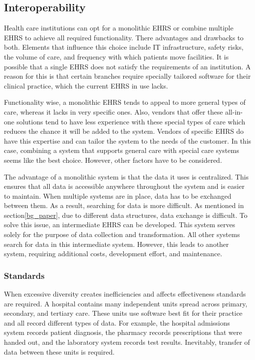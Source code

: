     


    \subsection{Interoperability}\label{bg_interoperability}

    Health care institutions can opt for a monolithic EHRS or combine multiple EHRS to achieve all required functionality. There advantages and drawbacks to both\cite{multiple_ehrs}. Elements that influence this choice include IT infrastructure, safety risks, the volume of care, and frequency with which patients move facilities. It is possible that a single EHRS does not satisfy the requirements of an institution. A reason for this is that certain branches require specially tailored software for their clinical practice, which the current EHRS in use lacks.

    Functionality wise, a monolithic EHRS tends to appeal to more general types of care, whereas it lacks in very specific ones. Also, vendors that offer these all-in-one solutions tend to have less experience with these special types of care which reduces the chance it will be added to the system. Vendors of specific EHRS do have this expertise and can tailor the system to the needs of the customer. In this case, combining a system that supports general care with special care systems seems like the best choice. However, other factors have to be considered.

    The advantage of a monolithic system is that the data it uses is centralized. This ensures that all data is accessible anywhere throughout the system and is easier to maintain. When multiple systems are in place, data has to be exchanged between them. As a result, searching for data is more difficult. As mentioned in section\ref{bg_paper}, due to different data structures, data exchange is difficult. To solve this issue, an intermediate EHRS can be developed. This system serves solely for the purpose of data collection and transformation. All other systems search for data in this intermediate system. However, this leads to another system, requiring additional costs, development effort, and maintenance.

        \subsubsection{Standards}\label{bg_standards}

        When excessive diversity creates inefficiencies and affects effectiveness standards are required\cite{Shortliffe2014}. A hospital contains many independent units spread across primary, secondary, and tertiary care. These units use software best fit for their practice and all record different types of data. For example, the hospital admissions system records patient diagnosis, the pharmacy records prescriptions that were handed out, and the laboratory system records test results. Inevitably, transfer of data between these units is required. 

